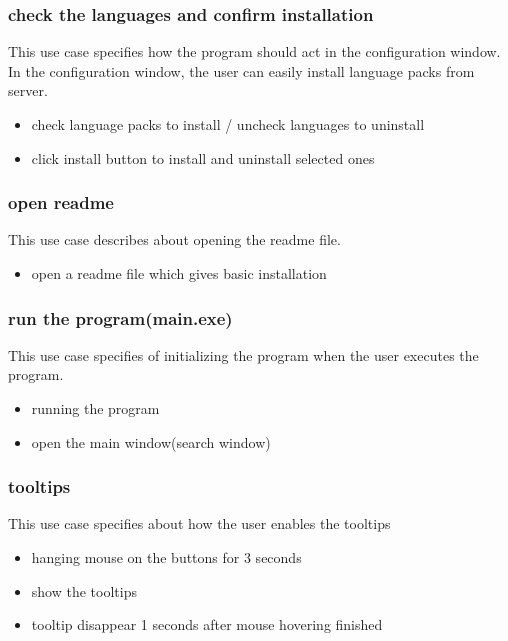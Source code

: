 \documentclass[conference]{IEEEtran}
\begin{document}
\subsubsection{check the languages and confirm installation}
This use case specifies how the program should act in the configuration window. In the configuration window, the user can easily install language packs from server.
\begin{itemize}
  \item check language packs to install / uncheck languages to uninstall
  \item click install button to install and uninstall selected ones
\end{itemize}
\textit{}



\subsubsection{open readme}
This use case describes about opening the readme file.
\begin{itemize}
  \item open a readme file which gives basic installation
\end{itemize}
\textit{}



\subsubsection{run the program(main.exe)}
This use case specifies of initializing the program when the user executes the program.
\begin{itemize}
  \item running the program
  \item open the main window(search window)
\end{itemize}
\textit{}


\subsubsection{tooltips}
This use case specifies about how the user enables the tooltips
\begin{itemize}
  \item hanging mouse on the buttons for 3 seconds
  \item show the tooltips
  \item tooltip disappear 1 seconds after mouse hovering finished
\end{itemize}
\textit{}
\end{document}
